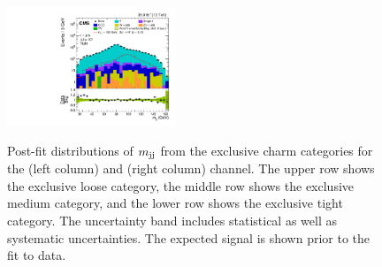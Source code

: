 \begin{figure}
{\includegraphics[width=0.45\textwidth]{Image/PostFit/mjj_postfit_ch6.pdf}}
\caption{Post-fit distributions of $m_\text{jj}$ from the exclusive charm
    categories for the \mujets (left column) and \ejets
    (right column) channel. The upper row shows the exclusive loose category,
    the middle row shows the exclusive medium category, and the lower row
    shows the exclusive tight category. The uncertainty band includes
    statistical as well as systematic uncertainties. The expected signal is
    shown prior to the fit to data.}
\label{fig:mjjPostFit}
\end{figure}
